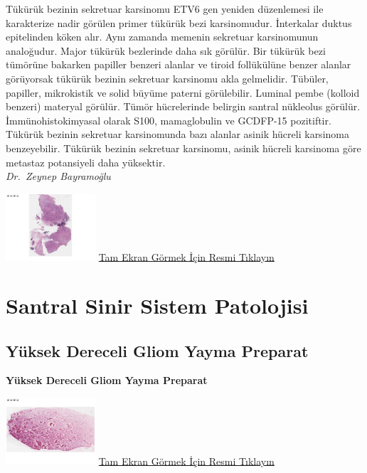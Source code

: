 \documentclass[
  letterpaper,
  DIV=11,
  numbers=noendperiod]{scrreprt}
\begin{document}
Tükürük bezinin sekretuar karsinomu ETV6 gen yeniden düzenlemesi ile
karakterize nadir görülen primer tükürük bezi karsinomudur. İnterkalar
duktus epitelinden köken alır. Aynı zamanda memenin sekretuar
karsinomunun analoğudur. Major tükürük bezlerinde daha sık görülür. Bir
tükürük bezi tümörüne bakarken papiller benzeri alanlar ve tiroid
follükülüne benzer alanlar görüyorsak tükürük bezinin sekretuar
karsinomu akla gelmelidir. Tübüler, papiller, mikrokistik ve solid
büyüme paterni görülebilir. Luminal pembe (kolloid benzeri) materyal
görülür. Tümör hücrelerinde belirgin santral nükleolus görülür.
İmmünohistokimyasal olarak S100, mamaglobulin ve GCDFP-15 pozitiftir.
Tükürük bezinin sekretuar karsinomunda bazı alanlar asinik hücreli
karsinoma benzeyebilir. Tükürük bezinin sekretuar karsinomu, asinik
hücreli karsinoma göre metastaz potansiyeli daha yüksektir.\\
\emph{Dr.~Zeynep Bayramoğlu}

\href{https://images.patolojiatlasi.com/mammary-analogue-secretory-carcinoma/HE1.html}{\includegraphics[width=0.25\textwidth,height=\textheight]{./screenshots/mammary-analogue-secretory-carcinoma1_screenshot.png}}
\href{https://images.patolojiatlasi.com/mammary-analogue-secretory-carcinoma/HE1.html}{Tam
Ekran Görmek İçin Resmi Tıklayın}

\part{Santral Sinir Sistem Patolojisi}

\hypertarget{sec-yuksek-dereceli-gliom-yayma-preparat}{%
\chapter{Yüksek Dereceli Gliom Yayma
Preparat}\label{sec-yuksek-dereceli-gliom-yayma-preparat}}

\textbf{Yüksek Dereceli Gliom Yayma Preparat}

\href{https://images.patolojiatlasi.com/high-grade-glioma-squash/HE.html}{\includegraphics[width=0.25\textwidth,height=\textheight]{./screenshots/high-grade-glioma-squash_screenshot.png}}
\href{https://images.patolojiatlasi.com/high-grade-glioma-squash/HE.html}{Tam
Ekran Görmek İçin Resmi Tıklayın}
\end{document}

